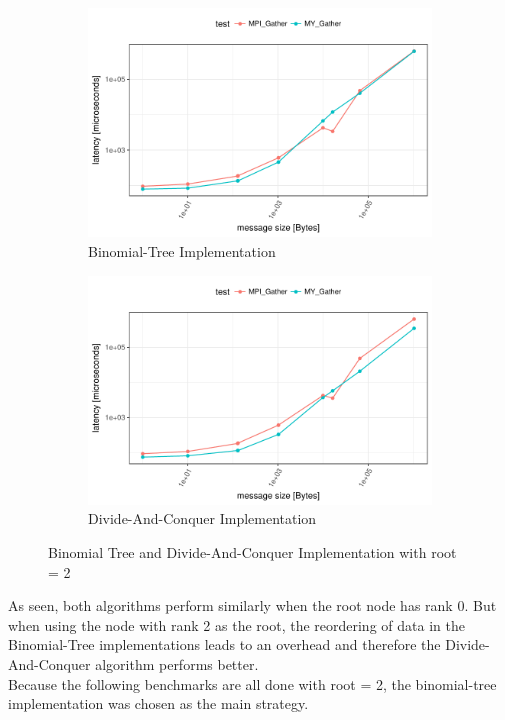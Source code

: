 \begin{figure}[H]
  \centering
  \begin{subfigure}[b]{0.49\textwidth}
        \includegraphics[width=\textwidth]{../benchmarks/openmpi/root=2/binom/gather_32/runtime.pdf}
        \caption{Binomial-Tree Implementation}
    \end{subfigure}
    \begin{subfigure}[b]{0.49\textwidth}
        \includegraphics[width=\textwidth]{../benchmarks/openmpi/root=2/divide_conquer/gather_32/runtime.pdf}
        \caption{Divide-And-Conquer Implementation}
    \end{subfigure}
    \caption{Binomial Tree and Divide-And-Conquer Implementation with root = 2}
    \label{fig:scatter:binom_vs_dac}
\end{figure}

As seen, both algorithms perform similarly when the root node has rank 0. But when using the node with rank 2 as the root, the reordering of data in the Binomial-Tree implementations leads to an overhead and therefore the Divide-And-Conquer algorithm performs better.\\
Because the following benchmarks are all done with root = 2, the binomial-tree implementation was chosen as the main strategy.

